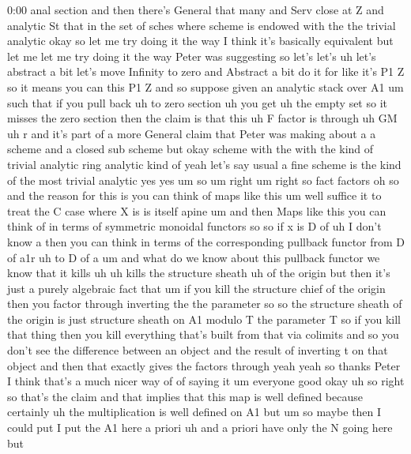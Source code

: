 \begin{unfinished}{0:00}
anal  section  and  then  there's  General
that  many  and  Serv  close  at  Z  and
analytic  St
that
in  the  set  of
sches  where  scheme  is  endowed  with  the
the  trivial
analytic  okay  so  let  me  try  doing  it  the
way  I  think  it's  basically  equivalent
but  let  me  let  me  try  doing  it  the  way
Peter  was  suggesting  so  let's  let's  uh
let's  abstract  a  bit  let's  move  Infinity
to  zero  and  Abstract  a  bit  do  it  for
like  it's  P1  Z  so  it  means  you  can  this
P1  Z
and  so  suppose  given  an  analytic  stack
over  A1  um  such  that  if  you  pull
back  uh  to  zero
section  uh  you  get  uh  the  empty  set  so
it  misses  the  zero  section  then  the
claim  is  that  this  uh  F  factor  is
through  uh
GM  uh  r
and  it's  part  of  a  more  General  claim
that  Peter  was  making  about  a  a  scheme
and  a  closed  sub  scheme  but  okay  scheme
with  the  with  the  kind  of  trivial
analytic  ring  analytic  kind  of  yeah
let's  say  usual  a  fine  scheme  is  the
kind  of  the  most  trivial  analytic  yes
yes
um  so
um
right
um  right  so  fact  factors  oh  so  and  the
reason  for  this  is  you  can  think  of  maps
like  this  um  well  suffice  it  to  treat
the  C  case  where  X  is  is  itself  apine  um
and  then  Maps  like  this  you  can  think  of
in  terms  of  symmetric  monoidal  functors
so  so  if  x  is  D  of  uh  I  don't  know  a
then  you  can  think  in  terms  of  the
corresponding  pullback  functor  from  D  of
a1r  uh  to  D  of
a  um  and  what  do  we  know  about  this
pullback  functor  we  know  that  it  kills
uh  uh  kills  the  structure
sheath  uh  of  the
origin  but  then  it's  just  a  purely
algebraic  fact  that  um  if  you  kill  the
structure  chief  of  the  origin  then  you
factor  through  inverting  the  the
parameter
so
so  the  structure  sheath  of  the  origin  is
just  structure  sheath  on  A1  modulo  T  the
parameter  T  so  if  you  kill  that  thing
then  you  kill  everything  that's  built
from  that  via  colimits  and  so  you  don't
see  the  difference  between  an  object  and
the  result  of  inverting  t  on  that  object
and  then  that  exactly  gives  the  factors
through  yeah
yeah  so  thanks  Peter  I  think  that's  a
much  nicer  way
of  of  saying
it
um  everyone
good
okay  uh  so  right  so  that's  the  claim  and
that  implies  that  this  map  is  well
defined  because  certainly  uh  the
multiplication  is  well  defined  on
A1  but  um
so  maybe  then  I  could  put  I  put  the  A1
here  a  priori  uh  and  a
priori  have  only  the  N  going  here  but

\end{unfinished}
